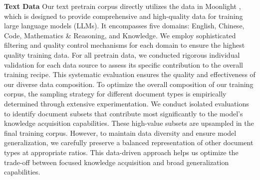 \documentclass{article}
\begin{document}
\textbf{Text Data}
Our text pretrain corpus directly utilizes the data in Moonlight \cite{liu2025muonscalablellmtraining}, which is designed to provide comprehensive and high-quality data for training large language models (LLMs). It encompasses five domains: English, Chinese, Code, Mathematics \& Reasoning, and Knowledge. 
We employ sophisticated filtering and quality control mechanisms for each domain to ensure the highest quality training data. For all pretrain data, we conducted rigorous individual validation for each data source to assess its specific contribution to the overall training recipe. This systematic evaluation ensures the quality and effectiveness of our diverse data composition.
To optimize the overall composition of our training corpus, the sampling strategy for different document types is empirically determined through extensive experimentation. We conduct isolated evaluations to identify document subsets that contribute most significantly to the model's knowledge acquisition capabilities. These high-value subsets are upsampled in the final training corpus. However, to maintain data diversity and ensure model generalization, we carefully preserve a balanced representation of other document types at appropriate ratios. This data-driven approach helps us optimize the trade-off between focused knowledge acquisition and broad generalization capabilities.
\end{document}
